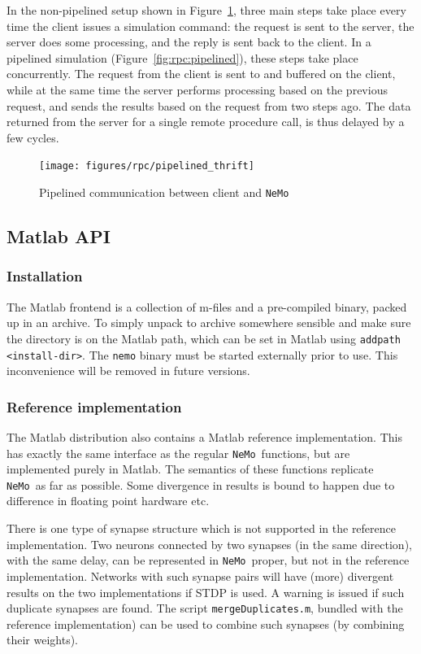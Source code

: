 \documentclass[a4paper]{article}
\newcommand{\nemo}{\texttt{NeMo}}
\newcommand{\command}[1]{\texttt{#1}}
\newcommand{\file}[1]{\texttt{#1}}
\begin{document}
In the non-pipelined setup shown in Figure~\ref{fig:rpc:basic},
	three main steps take place every time the client issues a simulation command: 
		the request is sent to the server,
		the server does some processing, and
		the reply is sent back to the client.
In a pipelined simulation (Figure~\ref{fig:rpc:pipelined}),
	these steps take place concurrently.
The request from the client is sent to and buffered on the client,
	while at the same time the server performs processing based on the previous
	request, 
	and sends the results based on the request from two steps ago. 
The data returned from the server for a single remote procedure call,
	is thus delayed by a few cycles.

\begin{figure}
	\texttt{[image: figures/rpc/pipelined\_thrift]}
	\caption{Pipelined communication between client and \nemo} 
	\label{fig:rpc:basic}
\end{figure}

\subsection{Matlab API}
\label{api:matlab}

\subsubsection{Installation}

The Matlab frontend is a collection of m-files and a pre-compiled binary, packed up in an archive.
To simply unpack to archive somewhere sensible and make sure the directory is on the Matlab path,
	which can be set in Matlab using \command{addpath <install-dir>}.
The \command{nemo} binary must be started externally prior to use.
This inconvenience will be removed in future versions.

\subsubsection{Reference implementation}

The Matlab distribution also contains a Matlab reference implementation.
This has exactly the same interface as the regular \nemo\ functions,
	but are implemented purely in Matlab.
The semantics of these functions replicate \nemo\ as far as possible.
Some divergence in results is bound to happen due to difference in floating point hardware etc.

There is one type of synapse structure which is not supported in the reference implementation.
Two neurons connected by two synapses (in the same direction), 
	with the same delay,
	can be represented in \nemo\ proper, but not in the reference implementation. 
Networks with such synapse pairs will have (more) divergent results on the two implementations if STDP is used.
A warning is issued if such duplicate synapses are found.
The script \file{mergeDuplicates.m}, bundled with the reference implementation)
	can be used to combine such synapses (by combining their weights).
\end{document}

